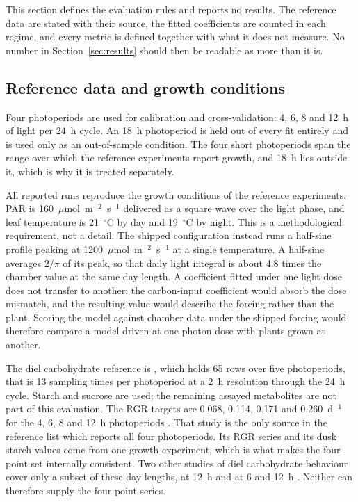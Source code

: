 This section defines the evaluation rules and reports no results. The reference
data are stated with their source, the fitted coefficients are counted in each
regime, and every metric is defined together with what it does not measure. No
number in Section~\ref{sec:results} should then be readable as more than it is.

\subsection{Reference data and growth conditions}

Four photoperiods are used for calibration and cross-validation: 4, 6, 8 and
12~h of light per 24~h cycle. An 18~h photoperiod is held out of every fit
entirely and is used only as an out-of-sample condition. The four short
photoperiods span the range over which the reference experiments report growth,
and 18~h lies outside it, which is why it is treated separately.

All reported runs reproduce the growth conditions of the reference experiments.
PAR is 160~$\mu$mol~m$^{-2}$~s$^{-1}$ delivered as a square wave over the light
phase, and leaf temperature is 21~$^\circ$C by day and 19~$^\circ$C by night.
This is a methodological requirement, not a detail. The shipped configuration
instead runs a half-sine profile peaking at
1200~$\mu$mol~m$^{-2}$~s$^{-1}$ at a single temperature. A half-sine averages
$2/\pi$ of its peak, so that daily light integral is about 4.8 times the chamber
value at the same day length. A coefficient fitted under one light dose does not
transfer to another:
the carbon-input coefficient would absorb the dose mismatch, and the resulting
value would describe the forcing rather than the plant. Scoring the model
against chamber data under the shipped forcing would therefore compare a model
driven at one photon dose with plants grown at another.

The diel carbohydrate reference is
, which holds 65 rows over five
photoperiods, that is 13 sampling times per photoperiod at a 2~h resolution
through the 24~h cycle. Starch and sucrose are used; the remaining assayed
metabolites are not part of this evaluation. The RGR targets are 0.068, 0.114,
0.171 and 0.260~d$^{-1}$ for the 4, 6, 8 and 12~h photoperiods
\citep{Sulpice2014}. That study is the only source in the reference list which
reports all four photoperiods. Its RGR series and its dusk starch values come
from one growth experiment, which is what makes the four-point set internally
consistent. Two other studies of diel carbohydrate behaviour cover only a subset
of these day lengths, at 12~h \citep{Annunziata2017} and at 6 and 12~h
\citep{Mengin2017}. Neither can therefore supply the four-point series.

